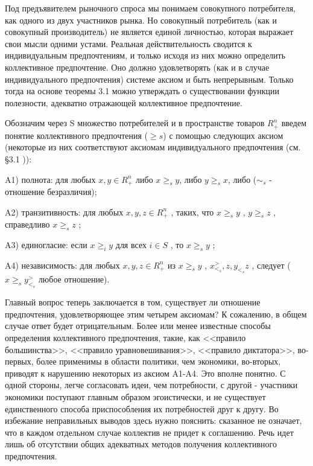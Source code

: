 \documentclass[12pt, 4paper]{book}
\begin{document}
{Под предъявителем рыночного спроса мы понимаем совокупного потребителя, как одного из двух участников рынка. Но совокупный потребитель (как и совокупный производитель) не является единой личностью, которая выражает свои мысли одними устами. Реальная действительность сводится к индивидуальным предпочтениям, и только исходя из них можно определить коллективное предпочтение. Оно должно удовлетворять (как и в случае индивидуального предпочтения) системе аксиом и быть непрерывным. Только тогда на основе теоремы 3.1 можно утверждать о существовании функции полезности, адекватно отражающей коллективное предпочтение.
\par

Обозначим через S множество потребителей и в пространстве товаров $R_{+}^{n}$ введем понятие коллективного предпочтения ($\geq s$) с помощью следующих аксиом (некоторые из них соответствуют аксиомам индивидуального предпочтения (см. §3.1 )):
\par

A1) полнота: для любых $x,y \in R_{+}^{n}$ либо $x \geq _s y$, либо $y \geq_s x$, либо  ($\sim_s$  - отношение безразличия); 
\par

A2) транзитивность: для любых $x,y,z \in R_{+}^{n}$ , таких, что $x \geq_s y$ , $y \geq_s z$ , справедливо $x \geq_s z$ ; 
\par

A3) единогласие: если $x \geq_i y$ для всех $i \in S$ , то $x \geq_s y$ ; 
\par

A4) независимость: для любых $x,y,z \in R_{+}^{n}$ из $x \geq_s y$ , $x_{<_{s}}^{>},z,y_{<_{s}} z$ , следует  ($x \geq_s y_{<_{s}}^{>} $ любое отношение).
\par

Главный вопрос теперь заключается в том, существует ли отношение предпочтения, удовлетворяющее этим четырем аксиомам? К сожалению, в общем случае ответ будет отрицательным. Более или менее известные способы определения коллективного предпочтения, такие, как <<правило большинства>>, <<правило уравновешивания>>, <<правило диктатора>>, во-первых, более применимы в области политики, чем экономики, во-вторых, приводят к нарушению некоторых из аксиом A1-A4. Это вполне понятно. С одной стороны, легче согласовать идеи, чем потребности, с другой - участники экономики поступают главным образом эгоистически, и не существует единственного способа приспособления их потребностей друг к другу. Во избежание неправильных выводов здесь нужно пояснить: сказанное не означает, что в каждом отдельном случае коллектив не придет к соглашению. Речь идет лишь об отсутствии общих адекватных методов получения коллективного предпочтения.
\par

}
\end{document}

